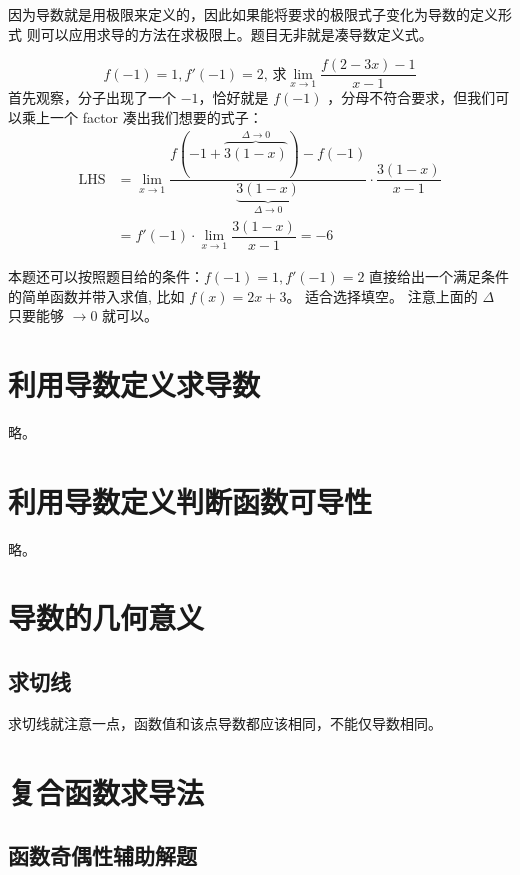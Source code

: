 因为导数就是用极限来定义的，因此如果能将要求的极限式子变化为导数的定义形式
则可以应用求导的方法在求极限上。题目无非就是凑导数定义式。

\begin{example}
    \[
        f(-1) = 1, f'(-1) = 2, \, \mbox{求} \lim_{x \to 1 } \dfrac{f(2-3x) - 1}{x-1}
    \]
    首先观察，分子出现了一个 $-1$，恰好就是 $f(-1)$ ，分母不符合要求，但我们可以乘上一个 factor
    凑出我们想要的式子：
    \begin{align*}
        \mbox{LHS} &= \lim_{x \to 1 } \dfrac{f(-1+\overbrace{3(1-x)}^{\Delta \to 0}) -
             f(-1)}{\underbrace{3(1-x)}_{\Delta \to 0}} \cdot \dfrac{3(1-x)}{x-1} \\
             &= f'(-1) \cdot \lim_{x \to 1} \dfrac{3(1-x)}{x-1} = -6
    \end{align*}
\end{example}
本题还可以按照题目给的条件：$f(-1) = 1, f'(-1) = 2$ 直接给出一个满足条件的简单函数并带入求值,
比如 $f(x) = 2x+3$。
适合选择填空。
注意上面的 $\Delta$ 只要能够 $\to 0$ 就可以。

\section{利用导数定义求导数}

略。

\section{利用导数定义判断函数可导性}

略。

\section{导数的几何意义}

\subsection{求切线}

求切线就注意一点，函数值和该点导数都应该相同，不能仅导数相同。

\section{复合函数求导法}

\subsection{函数奇偶性辅助解题}


